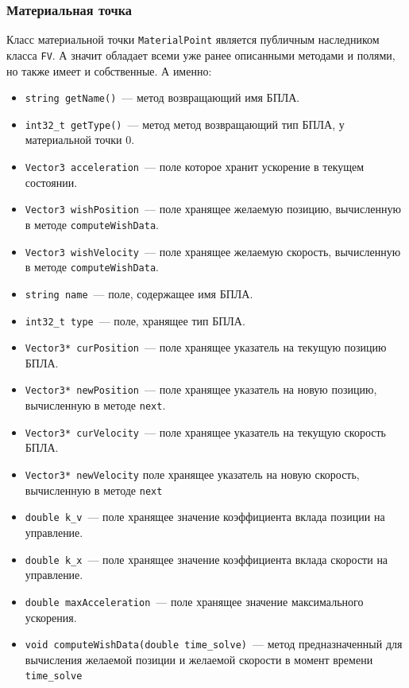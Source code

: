 \documentclass[a4paper,12pt]{article}
\begin{document}
\subsubsection{Материальная точка}
Класс материальной точки \texttt{MaterialPoint} является публичным наследником класса \texttt{FV}. А значит обладает всеми уже ранее описанными методами и полями, но также имеет и собственные. А именно:
\begin{itemize}
    \item \texttt{string getName()}~--- метод возвращающий имя БПЛА.
    \item \texttt{int32\_t getType()}~--- метод метод возвращающий тип БПЛА, у материальной точки 0.
    
    \item \texttt{Vector3 acceleration}~--- поле которое хранит ускорение в текущем состоянии.
    \item \texttt{Vector3 wishPosition}~--- поле хранящее желаемую позицию, вычисленную в методе \texttt{computeWishData}.
    \item \texttt{Vector3 wishVelocity}~--- поле хранящее желаемую скорость, вычисленную в методе \texttt{computeWishData}.
    \item \texttt{string name}~--- поле, содержащее имя БПЛА.
    \item \texttt{int32\_t type}~--- поле, хранящее тип БПЛА.

    \item\texttt{Vector3* curPosition}~--- поле хранящее указатель на текущую позицию БПЛА.
    \item\texttt{Vector3* newPosition}~--- поле хранящее указатель на новую позицию, вычисленную в методе \texttt{next}.
    \item\texttt{Vector3* curVelocity}~--- поле хранящее указатель на текущую скорость БПЛА.
    \item\texttt{Vector3* newVelocity} поле хранящее указатель на новую скорость, вычисленную в методе \texttt{next}
    \item\texttt{double k\_v}~--- поле хранящее значение коэффициента вклада позиции на управление.
    \item\texttt{double k\_x}~--- поле хранящее значение коэффициента вклада скорости на управление.
    \item\texttt{double maxAcceleration}~--- поле хранящее значение максимального ускорения.\textbf{}
    
    \item\texttt{void computeWishData(double time\_solve)}~--- метод предназначенный для вычисления желаемой позиции и желаемой скорости в момент времени \texttt{time\_solve}
\end{itemize}
\end{document}
